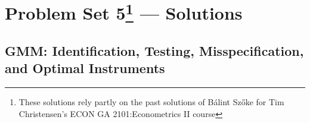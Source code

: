 \documentclass[12pt]{article}
\theoremstyle{definition}
\begin{document}

\section*{Problem Set 5\footnote{These solutions rely partly on the past solutions of Bálint Szőke for Tim Christensen's ECON GA 2101:Econometrics II course} --- Solutions}
\subsection*{GMM: Identification, Testing, Misspecification, and Optimal Instruments}

\vspace{1em}
\end{document}
